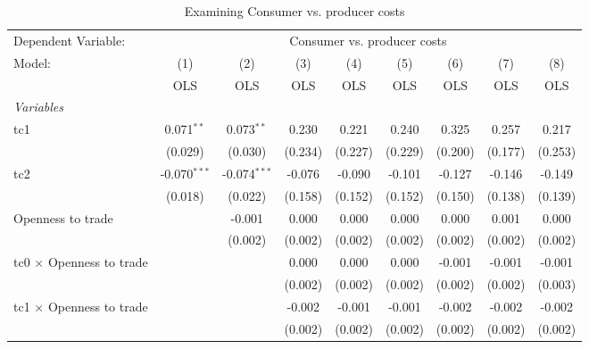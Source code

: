 
\begin{table}[htbp]
   \caption{Examining Consumer vs. producer costs}
   \centering
   \begin{tabular}{lcccccccc}
      \toprule
      Dependent Variable: & \multicolumn{8}{c}{Consumer vs. producer costs}\\
      Model:                                  & (1)            & (2)            & (3)     & (4)     & (5)     & (6)     & (7)     & (8)\\  
                                              &  OLS           & OLS            & OLS     & OLS     & OLS     & OLS     & OLS     & OLS\\  
      \midrule
      \emph{Variables}\\
      tc1                                     & 0.071$^{**}$   & 0.073$^{**}$   & 0.230   & 0.221   & 0.240   & 0.325   & 0.257   & 0.217\\   
                                              & (0.029)        & (0.030)        & (0.234) & (0.227) & (0.229) & (0.200) & (0.177) & (0.253)\\   
      tc2                                     & -0.070$^{***}$ & -0.074$^{***}$ & -0.076  & -0.090  & -0.101  & -0.127  & -0.146  & -0.149\\   
                                              & (0.018)        & (0.022)        & (0.158) & (0.152) & (0.152) & (0.150) & (0.138) & (0.139)\\   
      Openness to trade                       &                & -0.001         & 0.000   & 0.000   & 0.000   & 0.000   & 0.001   & 0.000\\   
                                              &                & (0.002)        & (0.002) & (0.002) & (0.002) & (0.002) & (0.002) & (0.002)\\   
      tc0 $\times$ Openness to trade          &                &                & 0.000   & 0.000   & 0.000   & -0.001  & -0.001  & -0.001\\   
                                              &                &                & (0.002) & (0.002) & (0.002) & (0.002) & (0.002) & (0.003)\\   
      tc1 $\times$ Openness to trade          &                &                & -0.002  & -0.001  & -0.001  & -0.002  & -0.002  & -0.002\\   
                                              &                &                & (0.002) & (0.002) & (0.002) & (0.002) & (0.002) & (0.002)\\   

\end{tabular}
\end{table}
